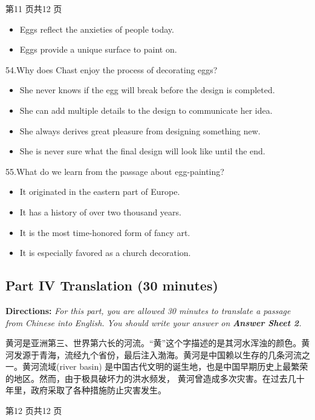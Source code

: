 \documentclass[UTF8,11pt]{ctexart}
\begin{document}
第11 页共12 页


\begin{itemize}[leftmargin=2em,itemsep=.2em,topsep=.4em]\item[C.] Eggs reflect the anxieties of people today.
\item[D.] Eggs provide a unique surface to paint on.
\end{itemize}

54.Why does Chast enjoy the process of decorating eggs?


\begin{itemize}[leftmargin=2em,itemsep=.2em,topsep=.4em]\item[A.] She never knows if the egg will break before the design is completed.
\item[B.] She can add multiple details to the design to communicate her idea.
\item[C.] She always derives great pleasure from designing something new.
\item[D.] She is never sure what the final design will look like until the end.
\end{itemize}

55.What do we learn from the passage about egg-painting?


\begin{itemize}[leftmargin=2em,itemsep=.2em,topsep=.4em]\item[A.] It originated in the eastern part of Europe.
\item[B.] It has a history of over two thousand years.
\item[C.] It is the most time-honored form of fancy art.
\item[D.] It is especially favored as a church decoration.
\end{itemize}

\subsection*{\textbf{Part IV} \textbf{Translation} \textbf{(30 minutes)}}


\textbf{Directions:}\textit{ For this part, you are allowed 30 minutes to translate a passage from Chinese into} \textit{English. You should write your answer on}\textbf{\textit{ Answer Sheet 2}}\textit{.}


黄河是亚洲第三、世界第六长的河流。“黄”这个字描述的是其河水浑浊的颜色。黄河发源于青海，流经九个省份，最后注入渤海。黄河是中国赖以生存的几条河流之一。黄河流域(river basin) 是中国古代文明的诞生地，也是中国早期历史上最繁荣的地区。然而，由于极具破坏力的洪水频发， 黄河曾造成多次灾害。在过去几十年里，政府采取了各种措施防止灾害发生。


第12 页共12 页
\end{document}
